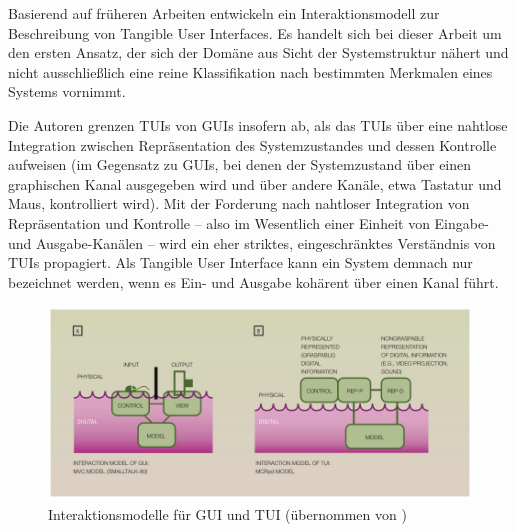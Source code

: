 Basierend auf früheren Arbeiten entwickeln \citet{Ullmer00} ein Interaktionsmodell zur Beschreibung von Tangible User Interfaces. Es handelt sich bei dieser Arbeit um den ersten Ansatz, der sich der Domäne aus Sicht der Systemstruktur nähert und nicht ausschließlich eine reine Klassifikation nach bestimmten Merkmalen eines Systems vornimmt.

Die Autoren grenzen \glspl{TUI} von \glspl{GUI} insofern ab, als das \glspl{TUI} über eine nahtlose Integration zwischen Repräsentation des Systemzustandes und dessen Kontrolle aufweisen (im Gegensatz zu \glspl{GUI}, bei denen der Systemzustand über einen graphischen Kanal ausgegeben wird und über andere Kanäle, etwa Tastatur und Maus, kontrolliert wird). Mit der Forderung nach nahtloser Integration von Repräsentation und Kontrolle -- also im Wesentlich einer Einheit von Eingabe- und Ausgabe-Kanälen -- wird ein eher striktes, eingeschränktes Verständnis von \glspl{TUI} propagiert. Als Tangible User Interface kann ein System demnach nur bezeichnet werden, wenn es Ein- und Ausgabe kohärent über einen Kanal führt.


\begin{figure}[htbp]
	\centering
		\includegraphics[width=12cm]{img/ImplementierungUeberblick/MCRpd.jpg}
	\caption[Interaktionsmodelle für GUI und TUI]{Interaktionsmodelle für GUI und TUI (übernommen von \citet{Ullmer00})}
	\label{fig:img_ImplementierungUeberblick_MCRpd}
\end{figure}


